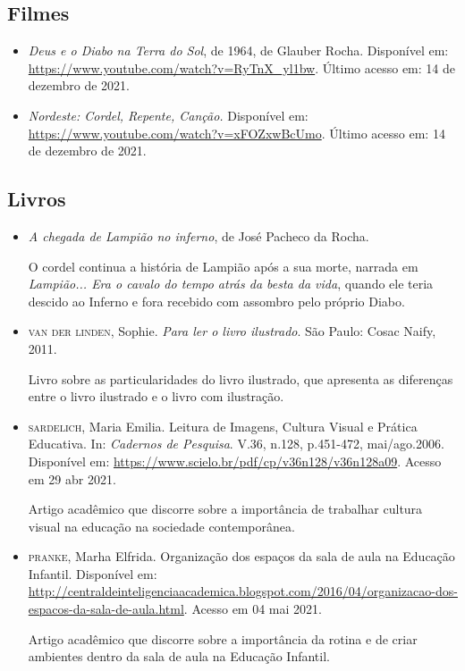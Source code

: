 \documentclass[11pt]{extarticle}
\begin{document}
\subsection{Filmes}

\begin{itemize}

	\item \textit{Deus e o Diabo na Terra do Sol}, de 1964, de Glauber Rocha. Disponível em: \url{https://www.youtube.com/watch?v=RyTnX_yl1bw}. Último acesso em: 14 de dezembro de 2021.

	\item \textit{Nordeste: Cordel, Repente, Canção.} Disponível em: \url{https://www.youtube.com/watch?v=xFOZxwBcUmo}. Último acesso em: 14 de dezembro de 2021.

\end{itemize}

\subsection{Livros}

\begin{itemize}
	\item \textit{A chegada de Lampião no inferno}, de José Pacheco da Rocha. 

O cordel continua a história de Lampião após a sua morte, narrada em \textit{Lampião... Era o cavalo do tempo atrás da besta da vida}, quando ele teria descido ao Inferno e fora recebido com assombro pelo próprio Diabo. 

	\item \textsc{van der linden}, Sophie. \textit{Para ler o livro ilustrado}. São Paulo: Cosac Naify, 2011.

Livro sobre as particularidades do livro ilustrado, que apresenta as diferenças entre o livro ilustrado e o livro com ilustração. 
\end{itemize}

\begin{itemize}
\item \textsc{sardelich}, Maria Emilia. Leitura de Imagens, Cultura Visual e Prática Educativa. 
In: \textit{Cadernos de Pesquisa}. V.36, n.128, p.451-472, mai/ago.2006. Disponível em: \url{https://www.scielo.br/pdf/cp/v36n128/v36n128a09}. 
Acesso em 29 abr 2021. 

Artigo acadêmico que discorre sobre a importância de trabalhar cultura 
visual na educação na sociedade contemporânea. 

\item \textsc{pranke}, Marha Elfrida. Organização dos espaços da sala de aula na Educação Infantil. Disponível em: \url{http://centraldeinteligenciaacademica.blogspot.com/2016/04/organizacao-dos-espacos-da-sala-de-aula.html}. Acesso em 04 mai 2021. 

Artigo acadêmico que discorre sobre a importância da rotina e de criar ambientes dentro da sala de aula na Educação Infantil.  
\end{itemize}
\end{document}
